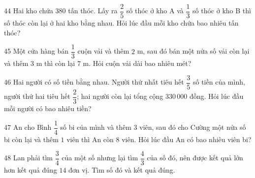 \gap
\begin{probbox}{44}{}
Hai kho chứa $380$ tấn thóc. Lấy ra $\dfrac25$ số thóc ở kho A và $\dfrac13$ số thóc ở kho B thì số thóc còn lại ở hai kho bằng nhau. Hỏi lúc đầu mỗi kho chứa bao nhiêu tấn thóc?
\end{probbox}
\gap
\begin{probbox}{45}{}
Một cửa hàng bán $\dfrac13$ cuộn vải và thêm $2$ m, sau đó bán một nửa số vải còn lại và thêm $3$ m thì còn lại $7$ m. Hỏi cuộn vải dài bao nhiêu mét?
\end{probbox}
\gap
\begin{probbox}{46}{}
Hai người có số tiền bằng nhau. Người thứ nhất tiêu hết $\dfrac35$ số tiền của mình, người thứ hai tiêu hết $\dfrac23$; hai người còn lại tổng cộng $330\,000$ đồng. Hỏi lúc đầu mỗi người có bao nhiêu tiền?
\end{probbox}
\gap
\begin{probbox}{47}{}
An cho Bình $\dfrac14$ số bi của mình và thêm $3$ viên, sau đó cho Cường một nửa số bi còn lại và thêm $1$ viên thì An còn $8$ viên. Hỏi lúc đầu An có bao nhiêu viên bi?
\end{probbox}
\gap
\begin{probbox}{48}{}
Lan phải tìm $\dfrac34$ của một số nhưng lại tìm $\dfrac43$ của số đó, nên được kết quả lớn hơn kết quả đúng $14$ đơn vị. Tìm số đó và kết quả đúng.
\end{probbox}
